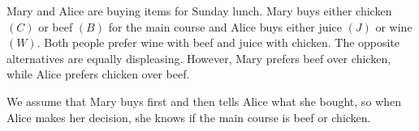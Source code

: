 \documentclass[addpoints]{exam}
\begin{document}
\begin{questions}
    \question 	      Mary and Alice are buying items for Sunday lunch. Mary buys either chicken $(C)$ or beef $(B)$ for the main course and Alice buys either juice $(J)$
    or wine $(W)$. Both people prefer wine with beef and juice with chicken. The opposite alternatives are equally displeasing.
    However, Mary prefers beef over chicken, while Alice prefers chicken over beef.

    We assume that Mary buys first and then tells Alice what she bought,
    so when Alice makes her decision, she knows if the main course is beef or chicken.
\end{questions}
\end{document}
